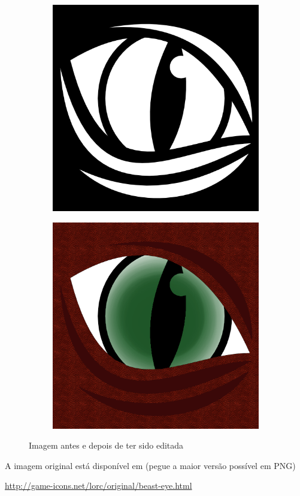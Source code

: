 \documentclass[12pt,onecolumn]{article}
\begin{document}
  \begin{figure}[H]
  \centering
  \begin{subfigure}{.5\textwidth}
    \centering
    \includegraphics[width=.7\linewidth]{beast-eye.png}
    \label{fig:ex1_before}
  \end{subfigure}%
  \begin{subfigure}{.5\textwidth}
    \centering
    \includegraphics[width=.7\linewidth]{draft00.png}
    \label{fig:ex1_after}
  \end{subfigure}
  \caption{Imagem antes e depois de ter sido editada}
  \label{fig:exercise1}
  \end{figure}

  A imagem original está disponível em (pegue a maior versão possível em PNG)
  \begin{center}
    \url{http://game-icons.net/lorc/original/beast-eye.html}      
  \end{center}
\end{document}
